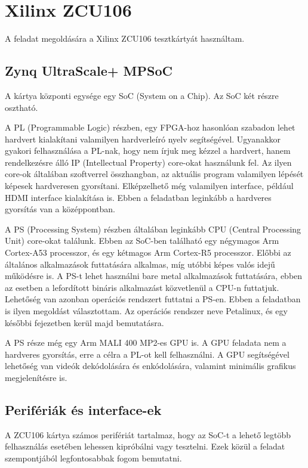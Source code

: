 \chapter{Xilinx ZCU106}
A feladat megoldására a Xilinx ZCU106 tesztkártyát használtam.\cite{ZCU106}

\section{Zynq UltraScale+ MPSoC}
A kártya központi egysége egy SoC (System on a Chip). Az SoC két részre osztható.

A PL (Programmable Logic) részben, egy FPGA-hoz hasonlóan szabadon lehet hardvert kialakítani valamilyen hardverleíró nyelv segítségével. Ugyanakkor gyakori felhasználása a PL-nak, hogy nem írjuk meg kézzel a hardvert, hanem rendelkezésre álló IP (Intellectual Property) core-okat használunk fel. Az ilyen core-ok általában szoftverrel összhangban, az aktuális program valamilyen lépését képesek hardveresen gyorsítani. Elképzelhető még valamilyen interface, például HDMI interface kialakítása is. Ebben a feladatban leginkább a hardveres gyorsítás van a középpontban.

A PS (Processing System) részben általában leginkább CPU (Central Processing Unit) core-okat találunk. Ebben az SoC-ben található egy négymagos Arm Cortex-A53 processzor, és egy kétmagos Arm Cortex-R5 processzor. Előbbi az általános alkalmazások futtatására alkalmas, míg utóbbi képes valós idejű működésre is. A PS-t lehet használni bare metal alkalmazások futtatására, ebben az esetben a lefordított bináris alkalmazást közvetlenül a CPU-n futtatjuk. Lehetőség van azonban operációs rendszert futtatni a PS-en. Ebben a feladatban is ilyen megoldást választottam. Az operációs rendszer neve Petalinux, és egy későbbi fejezetben kerül majd bemutatásra.

A PS része még egy Arm MALI 400 MP2-es GPU is. A GPU feladata nem a hardveres gyorsítás, erre a célra a PL-ot kell felhasználni. A GPU segítségével lehetőség van videók dekódolására és enkódolására, valamint minimális grafikus megjelenítésre is.

\section{Perifériák és interface-ek}
A ZCU106 kártya számos perifériát tartalmaz, hogy az SoC-t a lehető legtöbb felhasználás esetében lehessen kipróbálni vagy tesztelni. Ezek közül a feladat szempontjából legfontosabbak fogom bemutatni.

